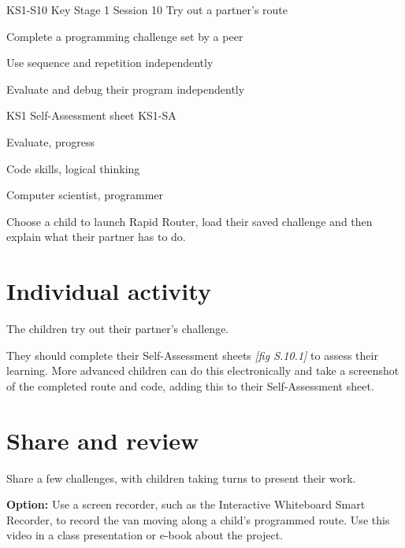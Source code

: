 \documentclass{../../../lessonplan}
\begin{document}
\lessonplantitle
    {KS1-S10}
    {Key Stage 1 Session 10}
    {Try out a partner's route}

\preamble
    {
    \item Complete a programming challenge set by a peer
    \item Use sequence and repetition independently
    \item Evaluate and debug their program independently
    }
    {
    \item KS1 Self-Assessment sheet KS1-SA
    \vspace{1cm}
    }
    {
    \item Evaluate, progress
    \item Code skills, logical thinking
    \item Computer scientist, programmer
    }

\begin{lessonplan}


Choose a child to launch Rapid Router, load their saved challenge and then explain what their partner has to do.

\section*{Individual activity}

The children try out their partner's challenge.

They should complete their Self-Assessment sheets \textit{[fig S.10.1]} to assess their learning.
More advanced children can do this electronically and take a screenshot of the completed route and code, adding this to their Self-Assessment sheet.

\section*{Share and review}

Share a few challenges, with children taking turns to present their work.






\textbf{Option:} Use a screen recorder, such as the Interactive Whiteboard Smart Recorder, to record the van moving along a child's programmed route.
Use this video in a class presentation or e-book about the project.

\end{lessonplan}
\end{document}
